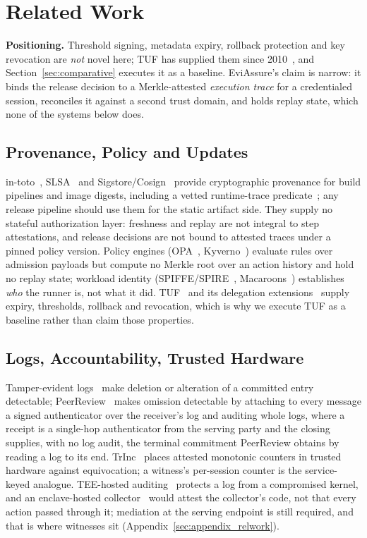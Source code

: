\documentclass[letterpaper,10pt,twocolumn]{article}
\theoremstyle{definition}
\begin{document}
\section{Related Work}

\textbf{Positioning.} Threshold signing, metadata expiry, rollback protection and key revocation are \emph{not} novel here; TUF has supplied them since 2010~\cite{samuel2010surviving}, and Section~\ref{sec:comparative} executes it as a baseline. EviAssure's claim is narrow: it binds the release decision to a Merkle-attested \emph{execution trace} for a credentialed session, reconciles it against a second trust domain, and holds replay state, which none of the systems below does.

\subsection{Provenance, Policy and Updates}
in-toto~\cite{torres2019in-toto}, SLSA~\cite{slsa2023supply} and Sigstore/Cosign~\cite{sigstore2022cosign} provide cryptographic provenance for build pipelines and image digests, including a vetted runtime-trace predicate~\cite{intoto_runtime_trace}; any release pipeline should use them for the static artifact side. They supply no stateful authorization layer: freshness and replay are not integral to step attestations, and release decisions are not bound to attested traces under a pinned policy version. Policy engines (OPA~\cite{opa2021openpolicy}, Kyverno~\cite{kyverno2022policy}) evaluate rules over admission payloads but compute no Merkle root over an action history and hold no replay state; workload identity (SPIFFE/SPIRE~\cite{spiffe2020spire}, Macaroons~\cite{birgisson2014macaroons}) establishes \emph{who} the runner is, not what it did. TUF~\cite{samuel2010surviving} and its delegation extensions~\cite{kuppusamy2016tuf, moore2023artemis} supply expiry, thresholds, rollback and revocation, which is why we execute TUF as a baseline rather than claim those properties.

\subsection{Logs, Accountability, Trusted Hardware}\label{sec:related-logs}
Tamper-evident logs~\cite{schneier1999secureauditlogs, crosby2009tamperevident} make deletion or alteration of a committed entry detectable; PeerReview~\cite{haeberlen2007peerreview} makes omission detectable by attaching to every message a signed authenticator over the receiver's log and auditing whole logs, where a receipt is a single-hop authenticator from the serving party and the closing supplies, with no log audit, the terminal commitment PeerReview obtains by reading a log to its end. TrInc~\cite{levin2009trinc} places attested monotonic counters in trusted hardware against equivocation; a witness's per-session counter is the service-keyed analogue. TEE-hosted auditing~\cite{paccagnella2020custos, ahmad2022hardlog} protects a log from a compromised kernel, and an enclave-hosted collector~\cite{costan2016sgxexplained} would attest the collector's code, not that every action passed through it; mediation at the serving endpoint is still required, and that is where witnesses sit (Appendix~\ref{sec:appendix_relwork}).
\end{document}
